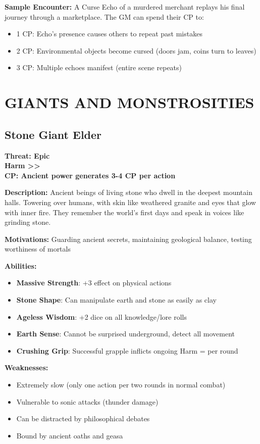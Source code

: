 \documentclass[12pt]{article}
\newcommand{\cp}[1]{\textbf{CP: #1}}
\newcommand{\harm}[1]{\textbf{Harm #1}}
\newcommand{\threat}[1]{\textbf{Threat: #1}}
\begin{document}
\textbf{Sample Encounter:}
A Curse Echo of a murdered merchant replays his final journey through a marketplace. The GM can spend their CP to:
\begin{itemize}
\item 1 CP: Echo's presence causes others to repeat past mistakes
\item 2 CP: Environmental objects become cursed (doors jam, coins turn to leaves)
\item 3 CP: Multiple echoes manifest (entire scene repeats)
\end{itemize}

\section{GIANTS AND MONSTROSITIES}

\subsection*{Stone Giant Elder}

\threat{Epic} \\
\harm{>>} \\
\cp{Ancient power generates 3-4 CP per action}

\vspace{0.5em}
\textbf{Description:} Ancient beings of living stone who dwell in the deepest mountain halls. Towering over humans, with skin like weathered granite and eyes that glow with inner fire. They remember the world's first days and speak in voices like grinding stone.

\textbf{Motivations:} Guarding ancient secrets, maintaining geological balance, testing worthiness of mortals

\textbf{Abilities:}
\begin{itemize}
\item \textbf{Massive Strength}: +3 effect on physical actions
\item \textbf{Stone Shape}: Can manipulate earth and stone as easily as clay
\item \textbf{Ageless Wisdom}: +2 dice on all knowledge/lore rolls
\item \textbf{Earth Sense}: Cannot be surprised underground, detect all movement
\item \textbf{Crushing Grip}: Successful grapple inflicts ongoing Harm = per round
\end{itemize}

\textbf{Weaknesses:}
\begin{itemize}
\item Extremely slow (only one action per two rounds in normal combat)
\item Vulnerable to sonic attacks (thunder damage)
\item Can be distracted by philosophical debates
\item Bound by ancient oaths and geasa
\end{itemize}
\end{document}

